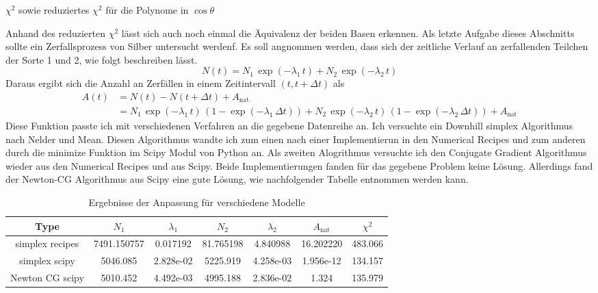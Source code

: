 \documentclass[12pt]{article}
\begin{document}
\begin{table}[H]\centering
    \caption{$\chi^2$ sowie reduziertes $\chi^2$ für die Polynome in $\cos\theta$}
    \end{table} 
Anhand des reduzierten $\chi^2$ lässt sich auch noch einmal die Äquivalenz der beiden Basen erkennen.
\newline\newline
Als letzte Aufgabe dieses Abschnitts sollte ein Zerfallsprozess von Silber untersucht werdenf. Es soll angnommen werden, dass sich der zeitliche Verlauf an zerfallenden Teilchen der Sorte 1 und 2, wie folgt beschreiben lässt.
$$N(t)=N_1\,\exp(-\lambda_1\,t)+N_2\,\exp(-\lambda_2\,t)$$
Daraus ergibt sich die Anzahl an Zerfällen in einem Zeitintervall $(t,t+\Delta{t})$ als
\begin{align*}A(t)&=N(t)-N(t+\Delta{t})+A_\text{nat}\\
    &=N_1\,\exp(-\lambda_1\,t)\,\left(1-\exp(-\lambda_1\,\Delta{t})\right)+N_2\,\exp(-\lambda_2\,t)\,\left(1-\exp(-\lambda_2\,\Delta{t})\right)+A_\text{nat}
\end{align*}
Diese Funktion passte ich mit verschiedenen Verfahren an die gegebene Datenreihe an. Ich versuchte ein Downhill simplex Algorithmus nach Nelder und Mean. Diesen Algorithmus wandte ich zum einen nach einer Implementierun in den Numerical Recipes und zum anderen durch die minimize Funktion im Scipy Modul von Python an. Als zweiten Alogrithmus versuchte ich den Conjugate Gradient Algorithmus wieder aus den Numerical Recipes und aus Scipy. Beide Implementierungen fanden für das gegebene Problem keine Lösung. Allerdings fand der Newton-CG Algorithmus aus Scipy eine gute Lösung, wie nachfolgender Tabelle entnommen werden kann.
\begin{table}[H]\hspace*{-1.4cm}\begin{tabular}{c|c|c|c|c|c|c}Type&$N_{1}$&$\lambda_1$&$N_{2}$&$\lambda_2$&$A_\text{nat}$&$\chi^2$\\\hline\hline
    simplex recipes&7491.150757 &    0.017192    &    81.765198  &     4.840988  &      16.202220&483.066\\
    simplex scipy&5046.085& 2.828e-02& 5225.919& 4.258e-03&1.956e-12&134.157\\
    Newton CG scipy&5010.452& 4.492e-03& 4995.188& 2.836e-02& 1.324&135.979\\
\end{tabular}\caption{Ergebnisse der Anpassung für verschiedene Modelle}\end{table}
\end{document}

